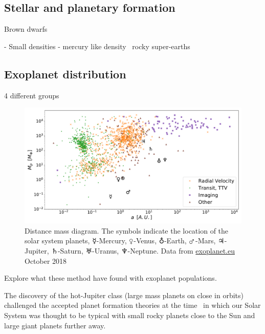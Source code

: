 


\subsection{Stellar and planetary formation}

Brown dwarfs


- Small densities - mercury like  density~\citet{dittmann_temperate_2017, santerne_earthsized_2018, ment_second_2018} rocky super-earths\\


\subsection{Exoplanet distribution} 4 different groups

\fref{}


\begin{figure}
    \centering
    \includegraphics[width=0.7\linewidth]{./figures/introduction/exoplanetEU_a_mass.pdf}
    \caption{Distance mass diagram.
        The symbols indicate the location of the solar system planets, $\mercury$-Mercury, $\venus$-Venus, $\earth$-Earth, $\mars$-Mars, $\jupiter$-Jupiter, $\saturn$-Saturn, $\uranus$-Uranus, $\neptune$-Neptune. Data from \href{http://ww.exoplanet.eu}{exoplanet.eu} October 2018}
    \label{fig:pltoverlayadd}
\end{figure}


Explore what these method have found with exoplanet populations.

The discovery of the hot-Jupiter class (large mass planets on close in orbits) challenged the accepted planet formation theories at the time~\citep[.e.g][]{pollack_formation_1996} in which our Solar System was thought to be typical with small rocky planets close to the Sun and large giant planets further away.


